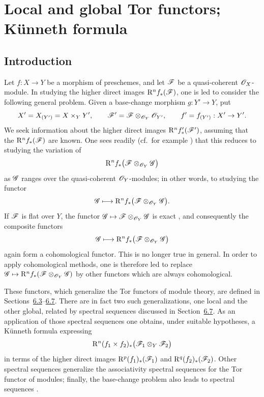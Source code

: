\section{Local and global Tor functors; K\"unneth formula}
\label{section:III.6}


\subsection{Introduction}
\label{subsection:III.6.1}


\begin{env}[6.1.1]
\label{III.6.1.1}
Let $f:X\to Y$ be a morphism of preschemes, and let $\mathscr{F}$ be
a quasi-coherent $\mathscr{O}_X$-module.  In studying the higher direct
images $\mathrm{R}^n f_*(\mathscr{F})$, one is led to consider the following
general problem.  Given a base-change morphism $g:Y'\to Y$, put
\[
  X'=X_{(Y')}=X\times_Y Y',\qquad
  \mathscr{F}'=\mathscr{F}\otimes_{\mathscr{O}_Y}\mathscr{O}_{Y'},\qquad
  f'=f_{(Y')}:X'\to Y'.
\]
We seek information about the higher direct images
$\mathrm{R}^n f'_*(\mathscr{F}')$, assuming that the
$\mathrm{R}^n f_*(\mathscr{F})$ are known.  One sees readily
(cf.\ for example ) that this reduces to studying
the variation of
\[
  \mathrm{R}^n f_*\bigl(\mathscr{F}\otimes_{\mathscr{O}_Y}\mathscr{G}\bigr)
\]
as $\mathscr{G}$ ranges over the quasi-coherent $\mathscr{O}_Y$-modules;
in other words, to studying the functor
\[
  \mathscr{G}\longmapsto
  \mathrm{R}^n f_*\bigl(\mathscr{F}\otimes_{\mathscr{O}_Y}\mathscr{G}\bigr).
\]
If $\mathscr{F}$ is flat over $Y$, the functor
$\mathscr{G}\mapsto\mathscr{F}\otimes_{\mathscr{O}_Y}\mathscr{G}$ is exact
, and consequently the composite functors
\[
  \mathscr{G}\longmapsto
  \mathrm{R}^n f_*\bigl(\mathscr{F}\otimes_{\mathscr{O}_Y}\mathscr{G}\bigr)
\]
again form a cohomological functor.  This is no longer true in
general.  In order to apply cohomological methods, one is therefore
led to replace
$\mathscr{G}\mapsto
\mathrm{R}^n f_*(\mathscr{F}\otimes_{\mathscr{O}_Y}\mathscr{G})$
by other functors which are always cohomological.

These functors, which generalize the Tor functors of module theory,
are defined in Sections~\hyperref[subsection:III.6.3]{6.3}--\hyperref[subsection:III.6.7]{6.7}.  There are in fact two such
generalizations, one local and the other global, related by spectral
sequences discussed in Section~\hyperref[subsection:III.6.7]{6.7}.  As an application of those
spectral sequences one obtains, under suitable hypotheses, a
K\"unneth formula expressing
\[
  \mathrm{R}^n(f_1\times f_2)_*
  \bigl(\mathscr{F}_1\otimes_Y\mathscr{F}_2\bigr)
\]
in terms of the higher direct images
$\mathrm{R}^p(f_1)_*(\mathscr{F}_1)$ and
$\mathrm{R}^q(f_2)_*(\mathscr{F}_2)$.  Other spectral sequences
 generalize the associativity spectral sequences for
the Tor functor of modules; finally, the base-change problem also
leads to spectral sequences .
\end{env}

